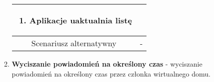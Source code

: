 \documentclass{article}
\begin{document}
\begin{enumerate}
\begin{enumerate}
\begin{table}[H]
\begin{tabular}{|c|p{7cm}|}
\begin{enumerate}
\item Aplikacje uaktualnia listę\end{enumerate} \\
						\hline
						Scenariusz alternatywny & -                                                                                                                                                                                                                                                                                                                                                                                                                                                                                                                                                        \\
						\hline
					\end{tabular}
				\end{table}

			\item \textbf{Wyciszanie powiadomień na określony czas} - wyciszanie
				powiadomień na określony czas przez członka wirtualnego domu.
		\end{enumerate}


\end{enumerate}
\end{document}
